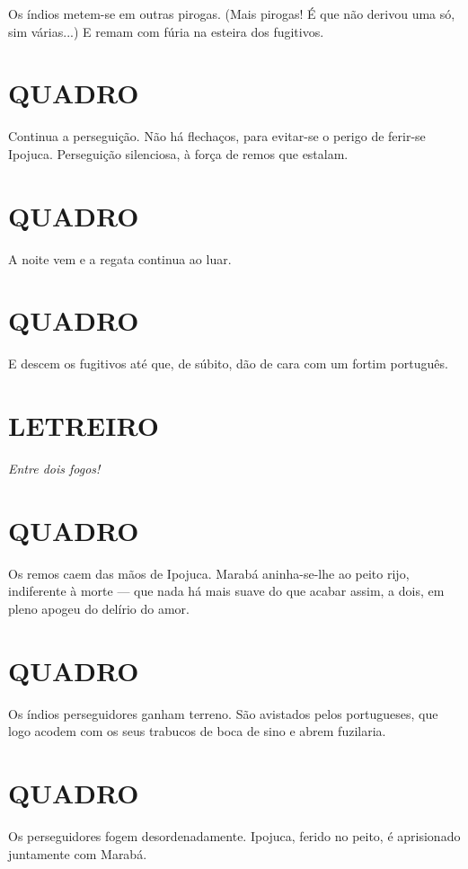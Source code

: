 Os índios metem-se em outras pirogas. (Mais pirogas! É que não derivou
uma só, sim várias...) E remam com fúria na esteira dos fugitivos.

\section{QUADRO}

Continua a perseguição. Não há flechaços, para evitar-se o perigo de
ferir-se Ipojuca. Perseguição silenciosa, à força de remos que estalam.

\section{QUADRO}

A noite vem e a regata continua ao luar.

\section{QUADRO}

E descem os fugitivos até que, de súbito, dão de cara com um fortim
português.

\section{LETREIRO}

\emph{Entre dois fogos!}

\section{QUADRO}

Os remos caem das mãos de Ipojuca. Marabá aninha-se-lhe ao peito rijo,
indiferente à morte --- que nada há mais suave do que acabar assim, a
dois, em pleno apogeu do delírio do amor.

\section{QUADRO}

Os índios perseguidores ganham terreno. São avistados pelos portugueses,
que logo acodem com os seus trabucos de boca de sino e abrem fuzilaria.

\section{QUADRO}

Os perseguidores fogem desordenadamente. Ipojuca, ferido no peito, é
aprisionado juntamente com Marabá.

